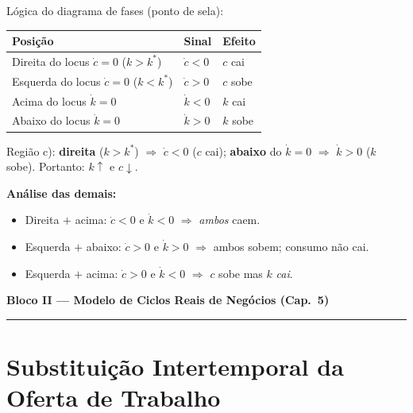 \documentclass[12pt, a4paper]{article}
\begin{document}
\begin{correctbox}[title={Resposta correta: c)}]
Lógica do diagrama de fases (ponto de sela):

\begin{center}
\begin{tabular}{lll}
\toprule
Posição & Sinal & Efeito \\
\midrule
Direita do locus $\dot{c}=0$ ($k>k^*$) & $\dot{c}<0$ & $c$ cai \\
Esquerda do locus $\dot{c}=0$ ($k<k^*$) & $\dot{c}>0$ & $c$ sobe \\
Acima do locus $\dot{k}=0$ & $\dot{k}<0$ & $k$ cai \\
Abaixo do locus $\dot{k}=0$ & $\dot{k}>0$ & $k$ sobe \\
\bottomrule
\end{tabular}
\end{center}

Região c): \textbf{direita} ($k>k^*$) $\Rightarrow$ $\dot{c}<0$ ($c$ cai);
\textbf{abaixo} do $\dot{k}=0$ $\Rightarrow$ $\dot{k}>0$ ($k$ sobe).
Portanto: $k\uparrow$ e $c\downarrow$. \checkmark

\textbf{Análise das demais:}
\begin{itemize}[leftmargin=*]
\item[a)] Direita $+$ acima: $\dot{c}<0$ e $\dot{k}<0$ $\Rightarrow$ \emph{ambos} caem.
\item[b)] Esquerda $+$ abaixo: $\dot{c}>0$ e $\dot{k}>0$ $\Rightarrow$ ambos sobem; consumo não cai.
\item[d)] Esquerda $+$ acima: $\dot{c}>0$ e $\dot{k}<0$ $\Rightarrow$ $c$ sobe mas $k$ \emph{cai}.
\end{itemize}
\end{correctbox}

\newpage
\begin{center}
{\large\bfseries\color{cyanrbc} Bloco II --- Modelo de Ciclos Reais de Negócios (Cap.\ 5)}\\[0.2em]
\rule{\linewidth}{0.6pt}
\end{center}

\section{Substituição Intertemporal da Oferta de Trabalho}
\end{document}
